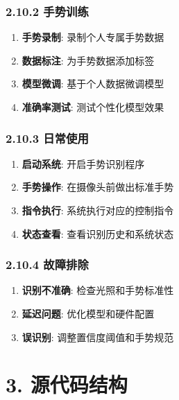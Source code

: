 \subsubsection{2.10.2 手势训练}\label{ux624bux52bfux8badux7ec3}

\begin{enumerate}
\def\labelenumi{\arabic{enumi}.}
\tightlist
\item
  \textbf{手势录制}: 录制个人专属手势数据
\item
  \textbf{数据标注}: 为手势数据添加标签
\item
  \textbf{模型微调}: 基于个人数据微调模型
\item
  \textbf{准确率测试}: 测试个性化模型效果
\end{enumerate}

\subsubsection{2.10.3 日常使用}\label{ux65e5ux5e38ux4f7fux7528}

\begin{enumerate}
\def\labelenumi{\arabic{enumi}.}
\tightlist
\item
  \textbf{启动系统}: 开启手势识别程序
\item
  \textbf{手势操作}: 在摄像头前做出标准手势
\item
  \textbf{指令执行}: 系统执行对应的控制指令
\item
  \textbf{状态查看}: 查看识别历史和系统状态
\end{enumerate}

\subsubsection{2.10.4 故障排除}\label{ux6545ux969cux6392ux9664}

\begin{enumerate}
\def\labelenumi{\arabic{enumi}.}
\tightlist
\item
  \textbf{识别不准确}: 检查光照和手势标准性
\item
  \textbf{延迟问题}: 优化模型和硬件配置
\item
  \textbf{误识别}: 调整置信度阈值和手势规范
\end{enumerate}

\section{3. 源代码结构}\label{ux6e90ux4ee3ux7801ux7ed3ux6784}


